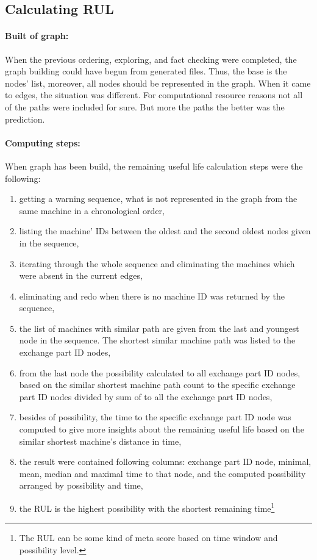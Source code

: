 	\subsection{Calculating RUL}
			\paragraph{Built of graph:}
			When the previous ordering, exploring, and fact checking were completed, the graph building could have begun from generated files. Thus, the base is the nodes' list, moreover, all nodes should be represented in the graph. When it came to edges, the situation was different. For computational resource reasons not all of the paths were included for sure. But more the paths the better was the prediction.
			\paragraph{Computing steps:}
			When graph has been build, the remaining useful life calculation steps were the following:
			\begin{enumerate}
				\item{getting a warning sequence, what is not represented in the graph from the same machine in a chronological order,}
				\item{listing the machine' IDs between the oldest and the second oldest nodes given in the sequence,}
				\item{iterating through the whole sequence and eliminating the machines which were absent in the current edges,}
				\item{eliminating and redo when there is no machine ID was returned by the sequence,}
				\item{the list of machines with similar path are given from the last and youngest node in the sequence. The shortest similar machine path was listed to the exchange part ID nodes,}
				\item{from the last node the possibility calculated to all exchange part ID nodes, based on the similar shortest machine path count to the specific exchange part ID nodes divided by sum of to all the exchange part ID nodes,}
				\item{besides of possibility, the time to the specific exchange part ID node was computed to give more insights about the remaining useful life based on the similar shortest machine's distance in time,}
				\item{the result were contained following columns: exchange part ID node, minimal, mean, median and maximal time to that node, and the computed possibility arranged by possibility and time,} 
		 		\item{the RUL is the highest possibility with the shortest remaining time\footnote{The RUL can be some kind of meta score based on time window and possibility level.}}
		 	\end{enumerate}
